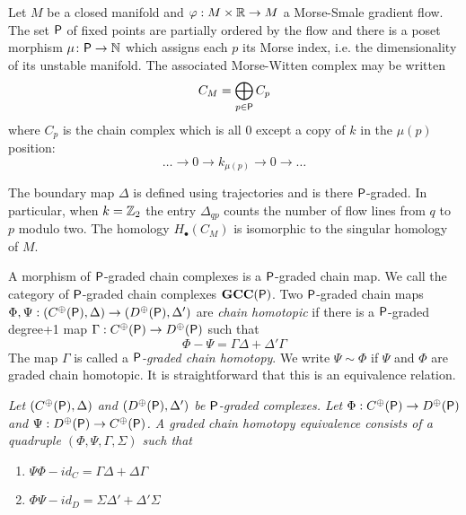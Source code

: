 \begin{ex}
Let $M$ be a closed manifold and $\varphi:M\times {\mathbb{R}}\to M$ a Morse-Smale gradient flow.  The set ${\mathsf P}$ of fixed points are partially ordered by the flow and there is a poset morphism $\mu\colon {\mathsf P}\to {\mathbb{N}}$ which assigns each $p$ its Morse index, i.e. the dimensionality of its unstable manifold.   The associated Morse-Witten complex may be written $$C_M = \bigoplus_{p\in {\mathsf P}} C_p$$ where $C_p$ is the chain complex which is all $0$ except a copy of $k$ in the $\mu(p)$ position: $$\ldots \to 0 \to k_{\mu(p)}\to 0\to \ldots$$

The boundary map $\Delta$ is defined using trajectories and is there ${\mathsf P}$-graded. In particular, when $k={\mathbb{Z}}_2$ the entry $\Delta_{qp}$ counts the number of flow lines from $q$ to $p$ modulo two.  The homology $H_\bullet(C_M)$ is isomorphic to the singular homology of $M$.
\end{ex}


A morphism of ${\mathsf P}$-graded chain complexes is a ${\mathsf P}$-graded chain map.   We call the category of ${\mathsf P}$-graded chain complexes $\bf{GCC({\mathsf P})}$.   Two ${\mathsf P}$-graded chain maps $\Phi,\Psi:(C^\oplus({\mathsf P}),\Delta)\to (D^\oplus({\mathsf P}),\Delta')$ are {\em chain homotopic} if there  is a ${\mathsf P}$-graded degree+1 map $\Gamma:C^\oplus({\mathsf P})\to D^\oplus({\mathsf P})$ such that 
\[
\Phi-\Psi = \Gamma\Delta + \Delta'\Gamma
\]
 The map $\Gamma$ is called a {\em ${\mathsf P}$-graded chain homotopy}.  We write $\Psi\sim \Phi$ if $\Psi$ and $\Phi$ are graded chain homotopic.  It is straightforward that this is an equivalence relation.
 
 \begin{defn}
 {\em
Let $(C^\oplus({\mathsf P}),\Delta)$ and $(D^\oplus({\mathsf P}),\Delta')$ be ${\mathsf P}$-graded complexes.  Let $\Phi:C^\oplus({\mathsf P})\to D^\oplus({\mathsf P})$ and $\Psi:D^\oplus({\mathsf P})\to C^\oplus({\mathsf P})$.  A {\em graded chain homotopy equivalence} consists of a quadruple $(\Phi,\Psi,\Gamma,\Sigma)$ such that
\begin{enumerate}
\item $\Psi\Phi - id_C = \Gamma\Delta + \Delta \Gamma$
\item $\Phi\Psi - id_D = \Sigma\Delta' + \Delta'\Sigma$
\end{enumerate}
}
 \end{defn}
 
